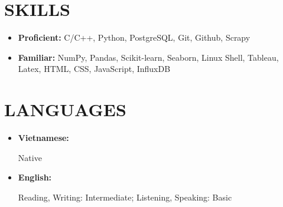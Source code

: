 \documentclass[letterpaper,11pt]{article}
\begin{document}
\section{SKILLS}
\vspace{1mm}
\begin{itemize}[leftmargin=*]
    \item \textbf{\small Proficient:} C/C++, Python, PostgreSQL, Git, Github, Scrapy
    \item \textbf{\small Familiar:} NumPy, Pandas, Scikit-learn, Seaborn, Linux Shell, Tableau, Latex,  HTML, CSS, JavaScript, InfluxDB
    
\end{itemize}
\section{LANGUAGES}
\vspace{1mm}
\begin{itemize}[leftmargin=*]
    \item \textbf{\small Vietnamese: }\raggedright Native
    \item \textbf{\small English: }\raggedright Reading, Writing: Intermediate; Listening, Speaking: Basic
\end{itemize}
\end{document}
